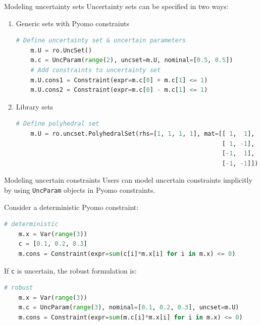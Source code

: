 \documentclass[slides,aspectratio=169]{beamer}
\begin{document}
\begin{frame}[fragile]{Modeling uncertainty sets}
    Uncertainty sets can be specified in two ways:
    \begin{enumerate}
        \item Generic sets with Pyomo constraints
\begin{lstlisting}[language=Python]
    # Define uncertainty set & uncertain parameters
    m.U = ro.UncSet()
    m.c = UncParam(range(2), uncset=m.U, nominal=[0.5, 0.5])
    # Add constraints to uncertainty set
    m.U.cons1 = Constraint(expr=m.c[0] + m.c[1] <= 1)
    m.U.cons2 = Constraint(expr=m.c[0] - m.c[1] <= 1)
\end{lstlisting}
        \item Library sets
\begin{lstlisting}[language=Python]
    # Define polyhedral set
    m.U = ro.uncset.PolyhedralSet(rhs=[1, 1, 1, 1], mat=[[ 1,  1],
                                                         [ 1, -1],
                                                         [-1,  1],
                                                         [-1, -1]])
\end{lstlisting}
    \end{enumerate}
\end{frame}

\begin{frame}[fragile]{Modeling uncertain constraints}
    Users can model uncertain constraints implicitly by using
    \lstinline{UncParam} objects in Pyomo constraints.

    Consider a deterministic Pyomo constraint:
\begin{lstlisting}[language=Python]
    # deterministic
    m.x = Var(range(3))
    c = [0.1, 0.2, 0.3]
    m.cons = Constraint(expr=sum(c[i]*m.x[i] for i in m.x) <= 0)
\end{lstlisting}
    If \lstinline{c} is uncertain, the robust formulation is:
\begin{lstlisting}[language=Python]
    # robust
    m.x = Var(range(3))
    m.c = UncParam(range(3), nominal=[0.1, 0.2, 0.3], uncset=m.U)
    m.cons = Constraint(expr=sum(m.c[i]*m.x[i] for i in m.x) <= 0)
\end{lstlisting}
\end{frame}
\end{document}
